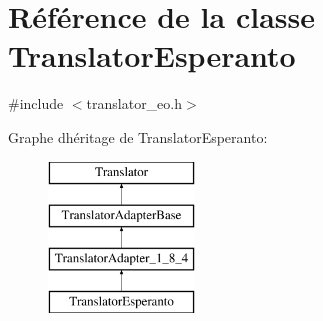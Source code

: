 \hypertarget{class_translator_esperanto}{}\section{Référence de la classe Translator\+Esperanto}
\label{class_translator_esperanto}


{\ttfamily \#include $<$translator\+\_\+eo.\+h$>$}

Graphe d\textquotesingle{}héritage de Translator\+Esperanto\+:\begin{figure}[H]
\begin{center}
\leavevmode
\includegraphics[height=4.000000cm]{class_translator_esperanto}
\end{center}
\end{figure}
